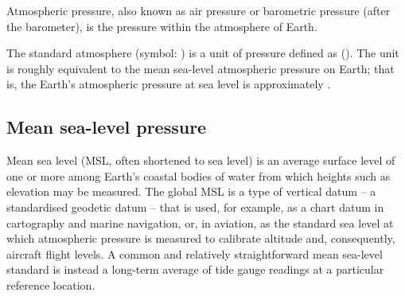 
Atmospheric pressure,
also known as air pressure or barometric pressure (after the barometer),
is the pressure within the atmosphere of Earth.

The standard atmosphere (symbol: \Atmospheres{}) is a unit of pressure defined as
 ().
The \Atmospheres{} unit is roughly equivalent to the mean sea-level atmospheric pressure on Earth;
that is, the Earth's atmospheric pressure at sea level is approximately .

\subsection[Mean sea-level]{Mean sea-level pressure}
\label{subsec:mean-sea-level-pressure}
Mean sea level (MSL, often shortened to sea level)
is an average surface level of one or more among Earth's coastal bodies of water from
which heights such as elevation may be measured.
The global MSL is a type of vertical datum – a standardised geodetic datum – that is used,
for example, as a chart datum in cartography and marine navigation,
or, in aviation, as the standard sea level at which atmospheric pressure
is measured to calibrate altitude and, consequently, aircraft flight levels.
A common and relatively straightforward mean sea-level standard is instead a
long-term average of tide gauge readings at a particular reference location.
